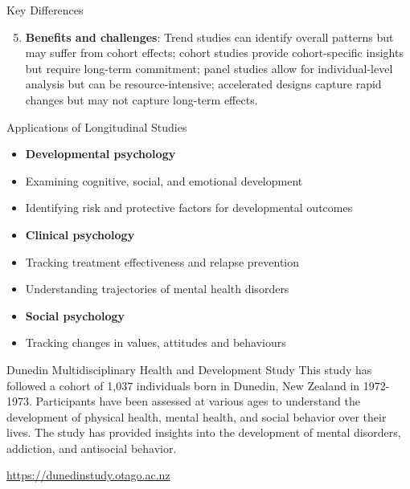 \documentclass[
  ignorenonframetext,
  aspectratio=169,
]{beamer}
\providecommand{\tightlist}{%
  \setlength{\itemsep}{0pt}\setlength{\parskip}{0pt}}\usepackage{longtable,booktabs,array}
\begin{document}
\begin{frame}{Key Differences}
\label{key-differences-2}
\begin{enumerate}
\setcounter{enumi}{4}
\tightlist
\item
  \textbf{Benefits and challenges}: Trend studies can identify overall
  patterns but may suffer from cohort effects; cohort studies provide
  cohort-specific insights but require long-term commitment; panel
  studies allow for individual-level analysis but can be
  resource-intensive; accelerated designs capture rapid changes but may
  not capture long-term effects.
\end{enumerate}
\end{frame}

\begin{frame}{Applications of Longitudinal Studies}
\label{applications-of-longitudinal-studies}
\begin{itemize}[<+->]
\tightlist
\item
  \textbf{Developmental psychology}
\item
  Examining cognitive, social, and emotional development
\item
  Identifying risk and protective factors for developmental outcomes
\item
  \textbf{Clinical psychology}
\item
  Tracking treatment effectiveness and relapse prevention
\item
  Understanding trajectories of mental health disorders
\item
  \textbf{Social psychology}
\item
  Tracking changes in values, attitudes and behaviours
\end{itemize}
\end{frame}

\begin{frame}{Dunedin Multidisciplinary Health and Development Study}
\label{dunedin-multidisciplinary-health-and-development-study}
This study has followed a cohort of 1,037 individuals born in Dunedin,
New Zealand in 1972-1973. Participants have been assessed at various
ages to understand the development of physical health, mental health,
and social behavior over their lives. The study has provided insights
into the development of mental disorders, addiction, and antisocial
behavior.

\url{https://dunedinstudy.otago.ac.nz}
\end{frame}
\end{document}
